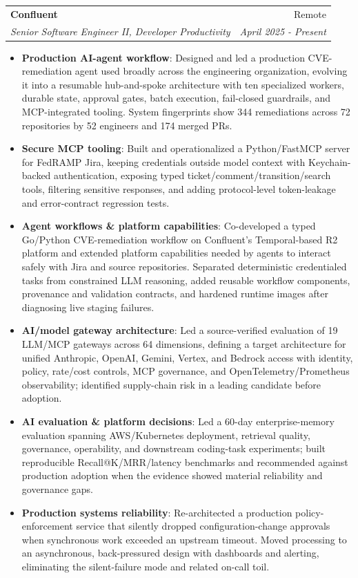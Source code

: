 \documentclass[letterpaper,11pt]{article}
\makeatletter
\newcommand{\resumeItem}[2]{
\item\small{
\textbf{#1}{: #2 \vspace{-2pt}}
}
}
\newcommand{\resumeSubheading}[4]{
\vspace{-1pt}\item
\begin{tabular*}{0.97\textwidth}[t]{l@{\extracolsep{\fill}}r}
    \textbf{#1}       & #2                 \\
    \textit{\small#3} & \textit{\small #4} \\
\end{tabular*}\vspace{-3pt}
}
\newcommand{\resumeItemListStart}{\begin{itemize}}
\newcommand{\resumeItemListEnd}{\end{itemize}\vspace{-5pt}}
\makeatother
\begin{document}
\resumeSubheading
{Confluent}{Remote}
{Senior Software Engineer II, Developer Productivity}{April 2025 - Present}
\resumeItemListStart
\resumeItem{Production AI-agent workflow}
{Designed and led a production CVE-remediation agent used broadly across the engineering organization, evolving it into a resumable hub-and-spoke architecture with ten specialized workers, durable state, approval gates, batch execution, fail-closed guardrails, and MCP-integrated tooling. System fingerprints show 344 remediations across 72 repositories by 52 engineers and 174 merged PRs.}
\resumeItem{Secure MCP tooling}
{Built and operationalized a Python/FastMCP server for FedRAMP Jira, keeping credentials outside model context with Keychain-backed authentication, exposing typed ticket/comment/transition/search tools, filtering sensitive responses, and adding protocol-level token-leakage and error-contract regression tests.}
\resumeItem{Agent workflows \& platform capabilities}
{Co-developed a typed Go/Python CVE-remediation workflow on Confluent's Temporal-based R2 platform and extended platform capabilities needed by agents to interact safely with Jira and source repositories. Separated deterministic credentialed tasks from constrained LLM reasoning, added reusable workflow components, provenance and validation contracts, and hardened runtime images after diagnosing live staging failures.}
\resumeItem{AI/model gateway architecture}
{Led a source-verified evaluation of 19 LLM/MCP gateways across 64 dimensions, defining a target architecture for unified Anthropic, OpenAI, Gemini, Vertex, and Bedrock access with identity, policy, rate/cost controls, MCP governance, and OpenTelemetry/Prometheus observability; identified supply-chain risk in a leading candidate before adoption.}
\resumeItem{AI evaluation \& platform decisions}
{Led a 60-day enterprise-memory evaluation spanning AWS/Kubernetes deployment, retrieval quality, governance, operability, and downstream coding-task experiments; built reproducible Recall@K/MRR/latency benchmarks and recommended against production adoption when the evidence showed material reliability and governance gaps.}
\resumeItem{Production systems reliability}
{Re-architected a production policy-enforcement service that silently dropped configuration-change approvals when synchronous work exceeded an upstream timeout. Moved processing to an asynchronous, back-pressured design with dashboards and alerting, eliminating the silent-failure mode and related on-call toil.}
\resumeItemListEnd
\end{document}
